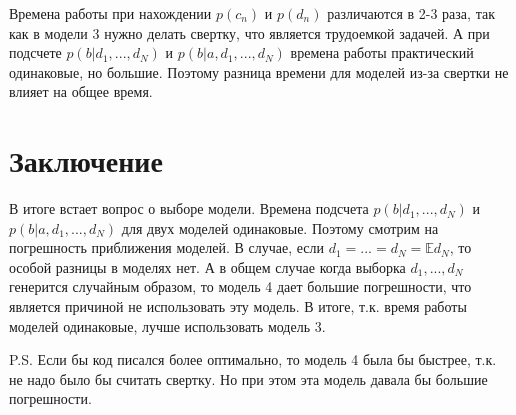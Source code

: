 \documentclass[12pt, a4paper]{article}
\begin{document}
		Времена работы при нахождении $p(c_n)$ и $p(d_n)$ различаются в 2-3 раза, так как в модели 3 нужно делать свертку, что является трудоемкой задачей. А при подсчете  $p(b|d_1, ..., d_N)$ и $p(b|a, d_1, ..., d_N)$ времена работы практический одинаковые, но большие. Поэтому разница времени для моделей из-за свертки не влияет на общее время.
		

	\newpage
	\section{Заключение}
		В итоге встает вопрос о выборе модели. Времена подсчета $p(b|d_1, ..., d_N)$ и $p(b|a, d_1, ..., d_N)$ для двух моделей одинаковые. Поэтому смотрим на погрешность приближения моделей. В случае, если $d_1 = ... = d_N = \mathbb{E} d_N$, то особой разницы в моделях нет. А в общем случае когда выборка $d_1, ..., d_N$ генерится случайным образом, то модель 4 дает большие погрешности, что является причиной не использовать эту модель. В итоге, т.к. время работы моделей одинаковые, лучше использовать модель 3.
		
		P.S. Если бы код писался более оптимально, то модель 4 была бы быстрее, т.к. не надо было бы считать свертку. Но при этом эта модель давала бы большие погрешности.
		
\end{document}
